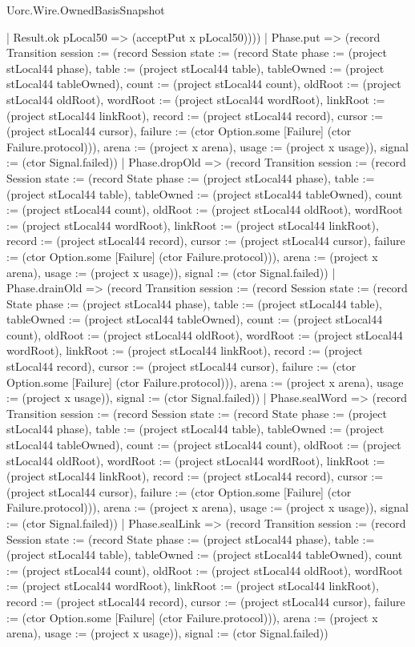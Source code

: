 \begin{lexlean}{Uorc.Wire.OwnedBasisSnapshot}
\begin{semanticmodule}
{            | Result.ok pLocal50 => (acceptPut x pLocal50))))
      | Phase.put => (record Transition {session := (record Session {state := (record State {phase := (project stLocal44 phase), table := (project stLocal44 table), tableOwned := (project stLocal44 tableOwned), count := (project stLocal44 count), oldRoot := (project stLocal44 oldRoot), wordRoot := (project stLocal44 wordRoot), linkRoot := (project stLocal44 linkRoot), record := (project stLocal44 record), cursor := (project stLocal44 cursor), failure := (ctor Option.some [Failure] (ctor Failure.protocol))}), arena := (project x arena), usage := (project x usage)}), signal := (ctor Signal.failed)})
      | Phase.dropOld => (record Transition {session := (record Session {state := (record State {phase := (project stLocal44 phase), table := (project stLocal44 table), tableOwned := (project stLocal44 tableOwned), count := (project stLocal44 count), oldRoot := (project stLocal44 oldRoot), wordRoot := (project stLocal44 wordRoot), linkRoot := (project stLocal44 linkRoot), record := (project stLocal44 record), cursor := (project stLocal44 cursor), failure := (ctor Option.some [Failure] (ctor Failure.protocol))}), arena := (project x arena), usage := (project x usage)}), signal := (ctor Signal.failed)})
      | Phase.drainOld => (record Transition {session := (record Session {state := (record State {phase := (project stLocal44 phase), table := (project stLocal44 table), tableOwned := (project stLocal44 tableOwned), count := (project stLocal44 count), oldRoot := (project stLocal44 oldRoot), wordRoot := (project stLocal44 wordRoot), linkRoot := (project stLocal44 linkRoot), record := (project stLocal44 record), cursor := (project stLocal44 cursor), failure := (ctor Option.some [Failure] (ctor Failure.protocol))}), arena := (project x arena), usage := (project x usage)}), signal := (ctor Signal.failed)})
      | Phase.sealWord => (record Transition {session := (record Session {state := (record State {phase := (project stLocal44 phase), table := (project stLocal44 table), tableOwned := (project stLocal44 tableOwned), count := (project stLocal44 count), oldRoot := (project stLocal44 oldRoot), wordRoot := (project stLocal44 wordRoot), linkRoot := (project stLocal44 linkRoot), record := (project stLocal44 record), cursor := (project stLocal44 cursor), failure := (ctor Option.some [Failure] (ctor Failure.protocol))}), arena := (project x arena), usage := (project x usage)}), signal := (ctor Signal.failed)})
      | Phase.sealLink => (record Transition {session := (record Session {state := (record State {phase := (project stLocal44 phase), table := (project stLocal44 table), tableOwned := (project stLocal44 tableOwned), count := (project stLocal44 count), oldRoot := (project stLocal44 oldRoot), wordRoot := (project stLocal44 wordRoot), linkRoot := (project stLocal44 linkRoot), record := (project stLocal44 record), cursor := (project stLocal44 cursor), failure := (ctor Option.some [Failure] (ctor Failure.protocol))}), arena := (project x arena), usage := (project x usage)}), signal := (ctor Signal.failed)})
}
\end{semanticmodule}
\end{lexlean}
